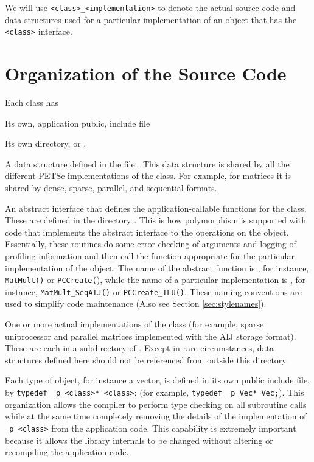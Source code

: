 We will use \lstinline{<class>_<implementation>} to denote the actual source code and
data structures used for a particular implementation of an object that has the
\lstinline{<class>} interface.

\section{Organization of the Source Code}

Each class has
\begin{tightitemize}
\item Its own, application public, include file 
\item Its own directory,  or .
\item A data structure defined in  the file
      .
      This data structure is shared by all the different PETSc implementations of the
      class. For example, for matrices it is shared by dense,
      sparse, parallel, and sequential formats.
\item An abstract interface that defines the application-callable
      functions for the class. These are defined in the directory
      . This is how polymorphism is supported with code that implements the abstract interface to the
operations on the object.  Essentially, these routines do some error
checking of arguments and logging of profiling information
and then call the function appropriate for the
particular implementation of the object. The name of the abstract
    function is , for instance, \lstinline{MatMult()} or \lstinline{PCCreate(}), while
the name of a particular implementation is
, for instance,
\lstinline{MatMult_SeqAIJ()} or \lstinline{PCCreate_ILU()}. These naming
    conventions are used to simplify code maintenance (Also see Section \ref{sec:stylenames}).

\item One or more actual implementations of the class (for example,
      sparse uniprocessor and parallel matrices implemented with the AIJ storage format).
      These are each in a subdirectory of
      . Except in rare circumstances, data
      structures defined here should not be referenced from outside this
      directory.
\end{tightitemize}

Each type of object, for instance a vector, is defined in its own
public include file, by \lstinline{typedef _p_<class>* <class>}; (for example, \lstinline{typedef _p_Vec* Vec;}).
  This organization allows the compiler to perform type checking on all subroutine calls
while at the same time
completely removing the details of the implementation of \lstinline{_p_<class>} from the application code.  This capability is extremely important
because it allows the library internals to be changed
without altering or recompiling the application code.

